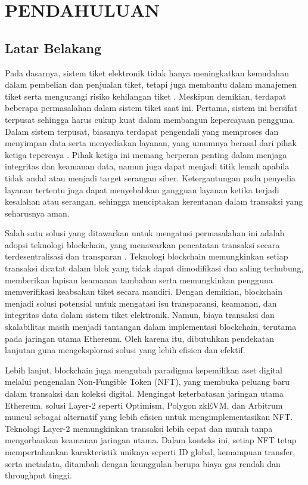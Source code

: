 \chapter{PENDAHULUAN}
\label{chap:pendahuluan}


\section{Latar Belakang}
\label{sec:latarbelakang}

Pada dasarnya, sistem tiket elektronik tidak hanya meningkatkan kemudahan dalam
pembelian dan penjualan tiket, tetapi juga membantu dalam manajemen tiket serta
mengurangi risiko kehilangan tiket \parencite{qteishat2014}. Meskipun demikian,
terdapat beberapa permasalahan dalam sistem tiket saat ini. Pertama, sistem ini
bersifat terpusat sehingga harus cukup kuat dalam membangun kepercayaan
pengguna. Dalam sistem terpusat, biasanya terdapat pengendali yang memproses
dan menyimpan data serta menyediakan layanan, yang umumnya berasal dari pihak
ketiga tepercaya \parencite{nakamoto2008bitcoin}. Pihak ketiga ini memang
berperan penting dalam menjaga integritas dan keamanan data, namun juga dapat
menjadi titik lemah apabila tidak andal atau menjadi target serangan siber.
Ketergantungan pada penyedia layanan tertentu juga dapat menyebabkan gangguan
layanan ketika terjadi kesalahan atau serangan, sehingga menciptakan kerentanan
dalam transaksi yang seharusnya aman.

Salah satu solusi yang ditawarkan untuk mengatasi permasalahan ini adalah
adopsi teknologi blockchain, yang menawarkan pencatatan transaksi secara
terdesentralisasi dan transparan \parencite{aventus2018}. Teknologi blockchain
memungkinkan setiap transaksi dicatat dalam blok yang tidak dapat dimodifikasi
dan saling terhubung, memberikan lapisan keamanan tambahan serta memungkinkan
pengguna memverifikasi keabsahan tiket secara mandiri. Dengan demikian,
blockchain menjadi solusi potensial untuk mengatasi isu transparansi, keamanan,
dan integritas data dalam sistem tiket elektronik. Namun, biaya transaksi dan
skalabilitas masih menjadi tantangan dalam implementasi blockchain, terutama
pada jaringan utama Ethereum. Oleh karena itu, dibutuhkan pendekatan lanjutan
guna mengeksplorasi solusi yang lebih efisien dan efektif.

Lebih lanjut, blockchain juga mengubah paradigma kepemilikan aset digital
melalui pengenalan Non-Fungible Token (NFT), yang membuka peluang baru dalam
transaksi dan koleksi digital. Mengingat keterbatasan jaringan utama Ethereum,
solusi Layer-2 seperti Optimism, Polygon zkEVM, dan Arbitrum muncul sebagai
alternatif yang lebih efisien untuk mengimplementasikan NFT. Teknologi Layer-2
memungkinkan transaksi lebih cepat dan murah tanpa mengorbankan keamanan
jaringan utama. Dalam konteks ini, setiap NFT tetap mempertahankan
karakteristik uniknya seperti ID global, kemampuan transfer, serta metadata,
ditambah dengan keunggulan berupa biaya gas rendah dan throughput tinggi.

